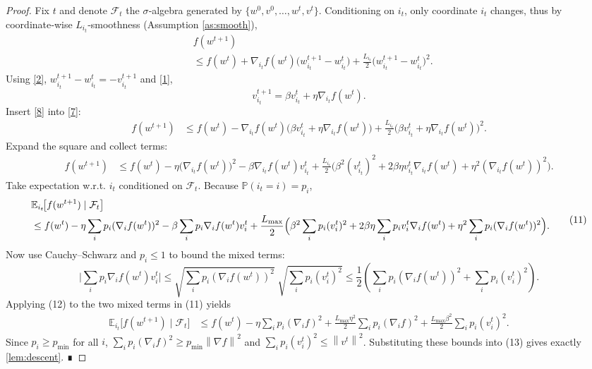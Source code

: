 \documentclass{article}
\newcommand{\E}{\mathbb{E}}
\newcommand{\norm}[1]{\left\|#1\right\|}
\newcommand{\grad}[1]{\nabla #1}
\begin{document}
\begin{proof}
Fix $t$ and denote $\mathcal{F}_{t}$ the $\sigma$‑algebra generated by $\{w^{0},v^{0},\dots,w^{t},v^{t}\}$.  
Conditioning on $i_t$, only coordinate $i_t$ changes, thus by coordinate‑wise $L_{i_t}$‑smoothness (Assumption \ref{as:smooth}),
\[
\begin{aligned}
    &f(w^{t+1}) \\
    &\le f(w^{t}) + \nabla_{i_t}f(w^{t})\bigl(w^{t+1}_{i_t}-w^{t}_{i_t}\bigr)
        +\frac{L_{i_t}}{2}\bigl(w^{t+1}_{i_t}-w^{t}_{i_t}\bigr)^{2}. \tag{7}
\end{aligned}
\]
Using \eqref{2}, $w^{t+1}_{i_t}-w^{t}_{i_t}=-v^{t+1}_{i_t}$ and \eqref{1},
\[
v^{t+1}_{i_t}= \beta v^{t}_{i_t}+ \eta \nabla_{i_t}f(w^{t}). \tag{8}
\]
Insert \eqref{8} into \eqref{7}:
\[
\begin{aligned}
    f(w^{t+1}) &\le f(w^{t}) -\nabla_{i_t}f(w^{t})\bigl(\beta v^{t}_{i_t}+ \eta \nabla_{i_t}f(w^{t})\bigr)
        +\frac{L_{i_t}}{2}\bigl(\beta v^{t}_{i_t}+ \eta \nabla_{i_t}f(w^{t})\bigr)^{2} .
\end{aligned}
\tag{9}
\]
Expand the square and collect terms:
\[
\begin{aligned}
    f(w^{t+1}) &\le f(w^{t})
        -\eta \bigl(\nabla_{i_t}f(w^{t})\bigr)^{2}
        -\beta \nabla_{i_t}f(w^{t}) v^{t}_{i_t}
        +\frac{L_{i_t}}{2}\bigl(\beta^{2}(v^{t}_{i_t})^{2}+2\beta\eta v^{t}_{i_t}\nabla_{i_t}f(w^{t})+\eta^{2}(\nabla_{i_t}f(w^{t}))^{2}\bigr) .
\end{aligned}
\tag{10}
\]
Take expectation w.r.t. $i_t$ conditioned on $\mathcal{F}_{t}$. Because $\mathbb{P}(i_t=i)=p_i$,
\[
\begin{aligned}
    &\E_{i_t}\!\bigl[f(w^{t+1})\mid\mathcal{F}_{t}\bigr] \\
    &\le f(w^{t}) -\eta\sum_{i}p_i(\nabla_i f(w^{t}))^{2}
        -\beta\sum_{i}p_i \nabla_i f(w^{t}) v^{t}_{i}
        +\frac{L_{\max}}{2}\Bigl(\beta^{2}\sum_{i}p_i (v^{t}_{i})^{2}
            +2\beta\eta\sum_{i}p_i v^{t}_{i}\nabla_i f(w^{t})
            +\eta^{2}\sum_{i}p_i (\nabla_i f(w^{t}))^{2}\Bigr) .
\end{aligned}
\tag{11}
\]
Now use Cauchy–Schwarz and $p_i\le1$ to bound the mixed terms:
\[
\bigl|\sum_{i}p_i \nabla_i f(w^{t}) v^{t}_{i}\bigr|
\le \sqrt{\sum_{i}p_i(\nabla_i f(w^{t}))^{2}}\;\sqrt{\sum_{i}p_i(v^{t}_{i})^{2}}
\le \frac12\!\left(\sum_{i}p_i(\nabla_i f(w^{t}))^{2}+\sum_{i}p_i(v^{t}_{i})^{2}\right). \tag{12}
\]
Applying (12) to the two mixed terms in (11) yields
\[
\begin{aligned}
    \E_{i_t}\!\bigl[f(w^{t+1})\mid\mathcal{F}_{t}\bigr]
    &\le f(w^{t})
        -\eta\sum_{i}p_i(\nabla_i f)^{2}
        +\frac{L_{\max}\eta^{2}}{2}\sum_{i}p_i(\nabla_i f)^{2}
        +\frac{L_{\max}\beta^{2}}{2}\sum_{i}p_i(v^{t}_{i})^{2} .
\end{aligned}
\tag{13}
\]
Since $p_i\ge p_{\min}$ for all $i$, $\sum_{i}p_i(\nabla_i f)^{2}\ge p_{\min}\norm{\grad f}^{2}$ and $\sum_{i}p_i(v^{t}_{i})^{2}\le \norm{v^{t}}^{2}$. Substituting these bounds into (13) gives exactly \eqref{lem:descent}. ∎
\end{proof}
\end{document}
